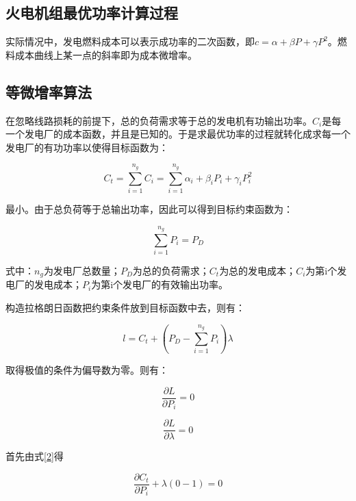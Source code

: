 \documentclass{cumcmthesis}
\begin{document}
\newpage
\begin{appendices}
	
	\section{火电机组最优功率计算过程}
	
	实际情况中，发电燃料成本可以表示成功率的二次函数，即$ c=\alpha+\beta P+\gamma P^{2} $。燃料成本曲线上某一点的斜率即为成本微增率。
	
	\subsection*{等微增率算法\cite{1}}
	在忽略线路损耗的前提下，总的负荷需求等于总的发电机有功输出功率。$ C_{i} $是每一个发电厂的成本函数，并且是已知的。于是求最优功率的过程就转化成求每一个发电厂的有功功率以使得目标函数为：
	
	\begin{equation}\label{target}
		C_{t}=\sum_{i=1}^{n_{g}}C_{i}=\sum_{i=1}^{n_{g}}\alpha_{i}+\beta_{i}P_{i}+\gamma_{i}P^{2}_{i}
	\end{equation}
	
	最小。由于总负荷等于总输出功率，因此可以得到目标约束函数为：
	
	\begin{equation}\label{key}
		\sum_{i=1}^{n_{g}}P_{i}=P_{D}
	\end{equation}
	
	式中：$ n_{g} $为发电厂总数量；$ P_{D} $为总的负荷需求；$ C_{t} $为总的发电成本；$ C_{i} $为第i个发电厂的发电成本；$ P_{i} $为第i个发电厂的有效输出功率。
	
	构造拉格朗日函数把约束条件放到目标函数中去，则有：
	
	\begin{equation}
		l=C_{t}+(P_{D}-\sum_{i=1}^{n_{g}}P_{i})\lambda
	\end{equation}
	
	取得极值的条件为偏导数为零。则有：
	
	\begin{equation}\label{2}
		\frac{\partial L}{\partial P_{i}}=0
	\end{equation}
	
	\begin{equation}\label{3}
		\frac{\partial L}{\partial\lambda}=0
	\end{equation}
	
	首先由式\ref{2}得
	
	\begin{equation}
		\frac{\partial C_{t}}{\partial P_{i}}+\lambda(0-1)=0
	\end{equation}
	

\end{appendices}
\end{document}
